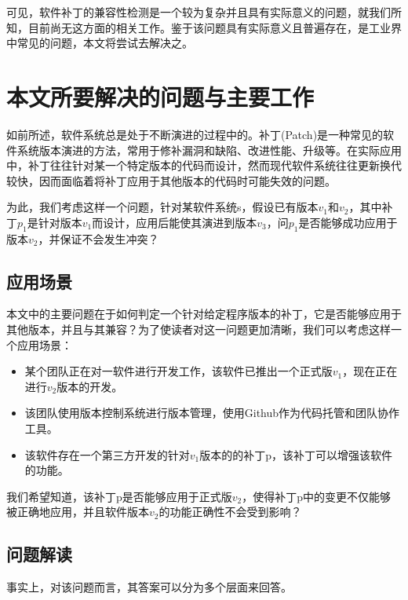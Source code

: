 可见，软件补丁的兼容性检测是一个较为复杂并且具有实际意义的问题，就我们所知，目前尚无这方面的相关工作。鉴于该问题具有实际意义且普遍存在，是工业界中常见的问题，本文将尝试去解决之。

\section{本文所要解决的问题与主要工作}

如前所述，软件系统总是处于不断演进的过程中的。补丁(Patch)是一种常见的软件系统版本演进的方法，常用于修补漏洞和缺陷、改进性能、升级等。在实际应用中，补丁往往针对某一个特定版本的代码而设计，然而现代软件系统往往更新换代较快，因而面临着将补丁应用于其他版本的代码时可能失效的问题。

为此，我们考虑这样一个问题，针对某软件系统s，假设已有版本$v_1$和$v_2$，其中补丁$p_1$是针对版本$v_1$而设计，应用后能使其演进到版本$v_3$，问$p_1$是否能够成功应用于版本$v_{2}$，并保证不会发生冲突？

\subsection{应用场景}
\label {app}

本文中的主要问题在于如何判定一个针对给定程序版本的补丁，它是否能够应用于其他版本，并且与其兼容？为了使读者对这一问题更加清晰，我们可以考虑这样一个应用场景：

\begin{itemize}
	\item 某个团队正在对一软件进行开发工作，该软件已推出一个正式版$v_{1}$，现在正在进行$v_{2}$版本的开发。
	
	\item 该团队使用版本控制系统进行版本管理，使用Github作为代码托管和团队协作工具。
	
	\item 该软件存在一个第三方开发的针对$v_{1}$版本的的补丁p，该补丁可以增强该软件的功能。
	
\end{itemize}

我们希望知道，该补丁p是否能够应用于正式版$v_{2}$，使得补丁p中的变更不仅能够被正确地应用，并且软件版本$v_{2}$的功能正确性不会受到影响？

\subsection{问题解读}

事实上，对该问题而言，其答案可以分为多个层面来回答。

